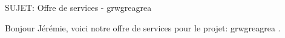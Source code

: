 SUJET: Offre de services - grwgreagrea \par Bonjour Jérémie, voici notre offre de services pour le projet: grwgreagrea .